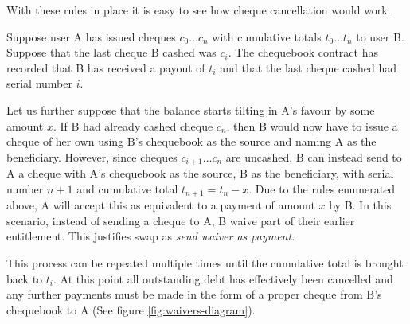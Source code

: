 With these rules in place it is easy to see how cheque cancellation would work. 



Suppose user A has issued cheques $c_0 \ldots c_n$ with cumulative totals $t_0 \ldots t_n$ to user B. Suppose that the last cheque B cashed was $c_i$. The chequebook contract has recorded that B has received a payout of $t_i$ and that the last cheque cashed had serial number $i$.

Let us further suppose that the balance starts tilting in A's favour by some amount $x$. If B had already cashed cheque $c_n$, then B would now have to issue a cheque of her own using B's chequebook as the source and naming A as the beneficiary. However, since cheques $c_{i+1} \ldots c_n$  are uncashed, B can instead send to A a cheque with A's chequebook as the source, B as the beneficiary, with serial number $n+1$ and cumulative total $t_{n+1} = t_n - x$. Due to the rules enumerated above, A will accept this as equivalent to a payment of amount $x$ by B.  In this scenario, instead of sending a cheque to A, B waive part of their earlier entitlement. This justifies swap as \emph{send waiver as payment}.

This process can be repeated multiple times until the cumulative total is brought back to $t_i$. At this point all outstanding debt has effectively been cancelled and any further payments must be made in the form of a proper cheque from B's chequebook to A (See figure \ref{fig:waivers-diagram}).



